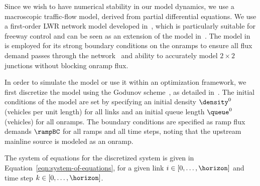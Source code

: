 Since we wish to have numerical stability in our model dynamics, we use a macroscopic traffic-flow model, derived from partial differential equations.
We use a first-order LWR \cite{lighthill1955kinematic,richards1956shock} network model developed in~\cite{Monache2013}, which is particularly suitable for freeway control and can be seen as an extension of the model in~\cite{garavello2006traffic}. The model in~\cite{Monache2013} is employed for its strong boundary conditions on the onramps to ensure all flux demand passes through the network~\cite{strub2006weak} and ability to accurately model $2\times2$ junctions without blocking onramp flux.

In order to simulate the model or use it within an optimization framework, we first discretize the model using the Godunov scheme~\cite{godunov1959}, as detailed in~\cite{Monache2013}. The initial conditions of the model are set by specifying an initial density $\po$ (vehicles per unit length) for all links and an initial queue length $\lo$ (vehicles) for all onramps. The boundary conditions are specified as ramp flux demands $\rampBC$ for all ramps and all time steps, noting that the upstream mainline source is modeled as an onramp.

The system of equations for the discretized system is given in Equation~\eqref{eqn:system-of-equations}, for a given link $i \in \left[0,\ldots,\horizon\right]$ and time step $k \in \left[0,\ldots,\horizon\right]$.

